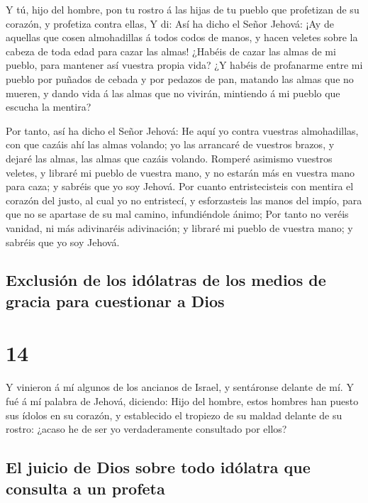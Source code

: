 Y tú, hijo del hombre, pon tu rostro á las hijas de tu
pueblo que profetizan de su corazón, y profetiza contra ellas,
 Y di: Así ha dicho el Señor Jehová: ¡Ay de aquellas que
cosen almohadillas á todos codos de manos, y hacen veletes sobre la
cabeza de toda edad para cazar las almas! ¿Habéis de cazar las almas de
mi pueblo, para mantener así vuestra propia vida?  ¿Y
habéis de profanarme entre mi pueblo por puñados de cebada y por pedazos
de pan, matando las almas que no mueren, y dando vida á las almas que no
vivirán, mintiendo á mi pueblo que escucha la mentira?

 Por tanto, así ha dicho el Señor Jehová: He aquí yo contra
vuestras almohadillas, con que cazáis ahí las almas volando; yo las
arrancaré de vuestros brazos, y dejaré las almas, las almas que cazáis
volando.  Romperé asimismo vuestros veletes, y libraré mi
pueblo de vuestra mano, y no estarán más en vuestra mano para caza; y
sabréis que yo soy Jehová.  Por cuanto entristecisteis con
mentira el corazón del justo, al cual yo no entristecí, y esforzasteis
las manos del impío, para que no se apartase de su mal camino,
infundiéndole ánimo;  Por tanto no veréis vanidad, ni más
adivinaréis adivinación; y libraré mi pueblo de vuestra mano; y sabréis
que yo soy Jehová.

\hypertarget{exclusiuxf3n-de-los-iduxf3latras-de-los-medios-de-gracia-para-cuestionar-a-dios}{%
\subsection{Exclusión de los idólatras de los medios de gracia para
cuestionar a
Dios}\label{exclusiuxf3n-de-los-iduxf3latras-de-los-medios-de-gracia-para-cuestionar-a-dios}}

\hypertarget{section-13}{%
\section{14}\label{section-13}}

 Y vinieron á mí algunos de los ancianos de Israel, y
sentáronse delante de mí.  Y fué á mí palabra de Jehová,
diciendo:  Hijo del hombre, estos hombres han puesto sus
ídolos en su corazón, y establecido el tropiezo de su maldad delante de
su rostro: ¿acaso he de ser yo verdaderamente consultado por ellos?

\hypertarget{el-juicio-de-dios-sobre-todo-iduxf3latra-que-consulta-a-un-profeta}{%
\subsection{El juicio de Dios sobre todo idólatra que consulta a un
profeta}\label{el-juicio-de-dios-sobre-todo-iduxf3latra-que-consulta-a-un-profeta}}

